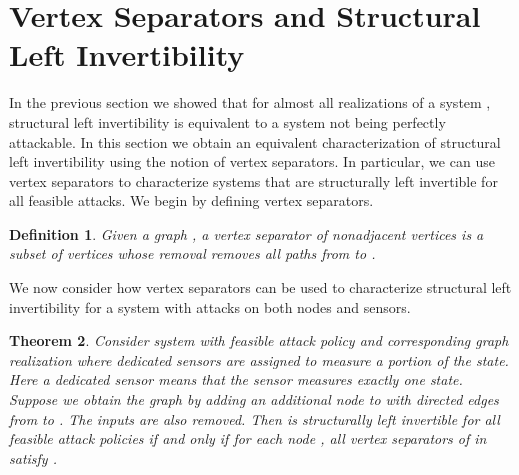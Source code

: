 \documentclass[letterpaper, 10 pt, conference]{ieeeconf}
\newtheorem{theorem}{Theorem}
\newtheorem{definition}[theorem]{Definition}
\begin{document}
\section{Vertex Separators and Structural Left Invertibility}
In the previous section we showed that for almost all realizations of a system , structural left invertibility is equivalent to a system not being perfectly attackable. In this section we obtain an equivalent characterization of structural left invertibility using the notion of vertex separators. In particular, we can use vertex separators to characterize systems that are structurally left invertible for all feasible attacks.
We begin by defining vertex separators.
\begin{definition}
 Given a  graph , a vertex separator  of nonadjacent vertices  is a subset of vertices whose removal  removes all paths from  to .
 \end{definition}
 We now consider how vertex separators can be used to characterize structural left invertibility for a system with attacks on both nodes and sensors.
\begin{theorem}
Consider system  with feasible attack policy  and corresponding graph realization  where  dedicated sensors are assigned to measure a portion of the state. Here a dedicated sensor means that the sensor measures exactly one state. Suppose we obtain the graph  by adding an additional node  to  with directed edges from  to . The inputs  are also removed. Then  is structurally left invertible for all feasible attack policies  if and only if for each node , all vertex separators  of  in  satisfy .  \label{MengerCor}
\end{theorem}
\end{document}
